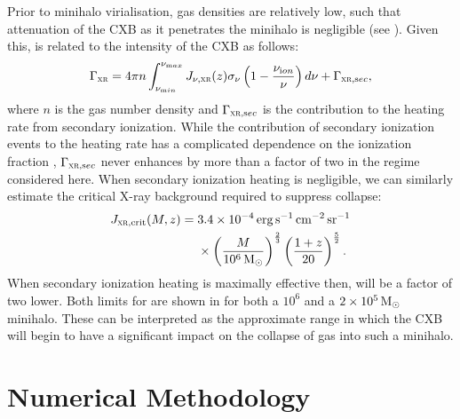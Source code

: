 \documentclass[../thesis.tex]{subfiles}
\begin{document}
Prior to minihalo virialisation, gas densities are relatively low, such that attenuation of the CXB as it penetrates the minihalo is negligible (see ). Given this, \gxr
is related to the intensity of the CXB as follows:
\begin{equation}
\Gamma_{\textsc{xr}} = 4\pi n \int_{\nu_{\mathrm min}}^{\nu_{\mathrm max}} J_{\nu, \textsc{xr}}(z) \sigma_{\nu}
\left(1 - \frac{\nu_{\mathrm ion}}{\nu} \right) d\nu + \Gamma_{\textsc{xr}, \mathrm sec},
\end{equation}
where $n$ is the gas number density and $\Gamma_{\textsc{xr}, \mathrm sec}$ is the contribution to the heating rate from secondary ionization. While the contribution of secondary ionization events to the heating rate has a complicated dependence on the ionization fraction \citep[][see  for details]{ShullvanSteenberg1985}, $\Gamma_{\textsc{xr}, \mathrm sec}$ never enhances \gxr by more than a factor of two in the regime considered here.  When secondary ionization heating is negligible, 
we can similarly estimate the critical X-ray background required to suppress collapse:
\begin{equation}
  \begin{split}
    J_{\textsc{xr}, \mathrm{crit}}(M,z) = \; & 3.4 \times 10^{-4} \,\mathrm{erg}\,\mathrm{s}^{-1} \,\mathrm{cm}^{-2} \,\mathrm{sr}^{-1}\\ &\times \left(\frac{M}{10^6\,\mathrm{M}_{\odot}}\right)^{\frac{2}{3}}
    \left(\frac{1+z}{20}\right)^{\frac{5}{2}}.
  \end{split}
\end{equation}
When secondary ionization heating is maximally effective then, \jcrit will be a factor of two lower. Both limits for \jcrit are shown in  for both a $10^6$  and a $2\times10^5\,\mathrm{M}_{\odot}$ minihalo.  These can be interpreted as the approximate range in which the CXB will begin to have a significant impact on the collapse of gas into such a minihalo.


\section{Numerical Methodology}
\label{xr_methods}
\end{document}
